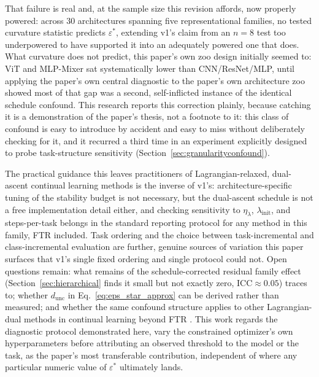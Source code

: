 \documentclass[11pt]{article}
\newcommand{\eps}{\varepsilon}
\newcommand{\epsstar}{\eps^{*}}
\begin{document}
That failure is real and, at the sample size this revision affords, now
properly powered: across 30 architectures spanning five representational
families, no tested curvature statistic predicts $\epsstar$, extending
v1's claim from an $n=8$ test too underpowered to have supported it into an
adequately powered one that does. What curvature does not predict, this
paper's own zoo design initially seemed to: ViT and MLP-Mixer sat systematically
lower than CNN/ResNet/MLP, until applying the paper's own central
diagnostic to the paper's own architecture zoo showed most of that gap was
a second, self-inflicted instance of the identical schedule confound.
This research reports this correction plainly, because catching it is a demonstration
of the paper's thesis, not a footnote to it: this class of confound is easy
to introduce by accident and easy to miss without deliberately checking for
it, and it recurred a third time in an experiment explicitly designed to
probe task-structure sensitivity (Section~\ref{sec:granularityconfound}).

The practical guidance this leaves practitioners of Lagrangian-relaxed,
dual-ascent continual learning methods is the inverse of v1's:
architecture-specific tuning of the stability budget is not necessary, but
the dual-ascent schedule is not a free implementation detail either, and
checking sensitivity to $\eta_\lambda$, $\lambda_{\mathrm{init}}$, and
steps-per-task belongs in the standard reporting protocol for any method in
this family, FTR included. Task ordering and the choice between
task-incremental and class-incremental evaluation are further, genuine
sources of variation this paper surfaces that v1's single fixed ordering
and single protocol could not. Open questions remain: what remains of the
schedule-corrected residual family effect (Section~\ref{sec:hierarchical}
finds it small but not exactly zero, ICC$\approx0.05$) traces to; whether
$d_{\mathrm{unc}}$ in Eq.~\ref{eq:eps_star_approx} can be derived rather
than measured; and whether the same confound structure applies to other
Lagrangian-dual methods in continual learning beyond FTR
\citep{elenter2023primal,chamon2023constrained}. This work regards the diagnostic
protocol demonstrated here, vary the constrained optimizer's own
hyperparameters before attributing an observed threshold to the model or
the task, as the paper's most transferable contribution, independent of
where any particular numeric value of $\epsstar$ ultimately lands.



\end{document}
